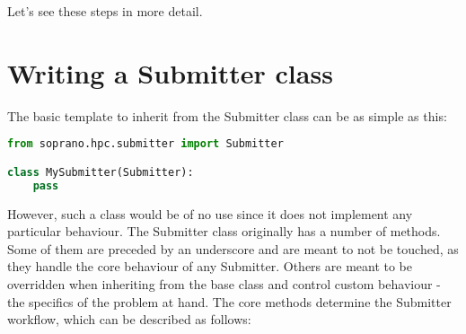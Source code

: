 \documentclass[]{report}
\begin{document}
Let's see these steps in more detail.

\section{Writing a Submitter class}

The basic template to inherit from the Submitter class can be as simple as this:

\begin{lstlisting}[language=python]
from soprano.hpc.submitter import Submitter

class MySubmitter(Submitter):
	pass
\end{lstlisting}

However, such a class would be of no use since it does not implement any particular behaviour. The Submitter class originally has a number of methods. Some of them are preceded by an underscore and are meant to not be touched, as they handle the core behaviour of any Submitter. Others are meant to be overridden when inheriting from the base class and control custom behaviour - the specifics of the problem at hand. The core methods determine the Submitter workflow, which can be described as follows:
\end{document}
